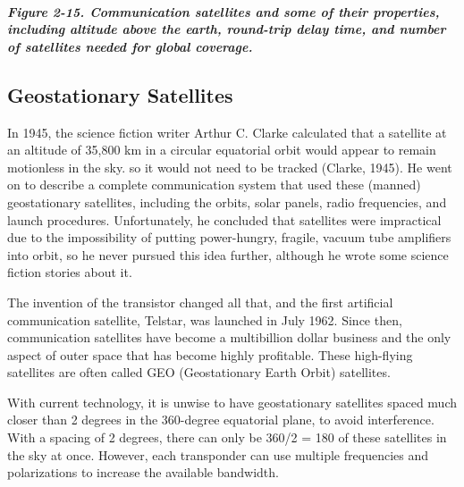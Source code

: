 \documentclass[b5paper,11pt]{memoir}
\begin{document}
\subparagraph[Figure 2-15. Communication satellites and some of their
properties, including altitude above the earth, round-trip delay time,
and number of satellites needed for global
coverage.]{\texorpdfstring{\protect\hypertarget{0130661023_ch02lev1sec4.htmlux5cux23ch02fig15}{}{}Figure
2-15. Communication satellites and some of their properties, including
altitude above the earth, round-trip delay time, and number of
satellites needed for global
coverage.}{Figure 2-15. Communication satellites and some of their properties, including altitude above the earth, round-trip delay time, and number of satellites needed for global coverage.}}


\protect\hypertarget{0130661023_ch02lev1sec4.htmlux5cux23ch02lev2sec13}{}{}

\subsection{Geostationary Satellites}

In 1945, the science fiction writer Arthur C. Clarke calculated that a
satellite at an altitude of 35,800 km in a circular equatorial orbit
would appear to remain motionless in the sky. so it would not need to be
tracked (Clarke, 1945). He went on to describe a complete communication
system that used these (manned) {geostationary satellites}, including
the orbits, solar panels, radio frequencies, and launch procedures.
Unfortunately, he concluded that satellites were impractical due to the
impossibility of putting power-hungry, fragile, vacuum tube amplifiers
into orbit, so he never pursued this idea further, although he wrote
some science fiction stories about it.

The invention of the transistor changed all that, and the first
artificial communication satellite, Telstar, was launched in July 1962.
Since then, communication satellites have become a multibillion dollar
business and the only aspect of outer space that has become highly
profitable. These high-flying satellites are often called {GEO}
({Geostationary Earth Orbit}) satellites.

With current technology, it is unwise to have geostationary satellites
spaced much closer than 2 degrees in the 360-degree equatorial plane, to
avoid interference. With a spacing of 2 degrees, there can only be 360/2
= 180 of these satellites in the sky at once. However, each transponder
can use multiple frequencies and polarizations to increase the available
bandwidth.
\end{document}
